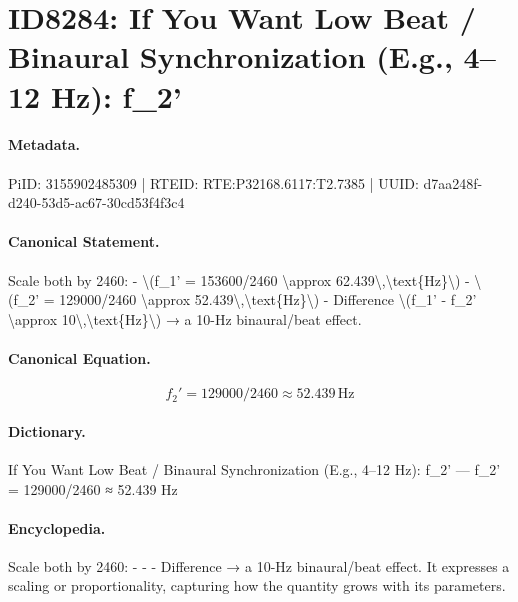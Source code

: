 \section*{ID8284: If You Want Low Beat / Binaural Synchronization (E.g., 4–12 Hz): f\_2'}
\paragraph{Metadata.}
PiID: 3155902485309 | RTEID: RTE:P32168.6117:T2.7385 | UUID: d7aa248f-d240-53d5-ac67-30cd53f4f3c4

\paragraph{Canonical Statement.}
Scale both by 2460: - \textbackslash{}(f\_1' = 153600/2460 \textbackslash{}approx 62.439\textbackslash{},\textbackslash{}text\{Hz\}\textbackslash{}) - \textbackslash{}(f\_2' = 129000/2460 \textbackslash{}approx 52.439\textbackslash{},\textbackslash{}text\{Hz\}\textbackslash{}) - Difference \textbackslash{}(f\_1' - f\_2' \textbackslash{}approx 10\textbackslash{},\textbackslash{}text\{Hz\}\textbackslash{}) → a 10-Hz binaural/beat effect.

\paragraph{Canonical Equation.}
\[
f_2' = 129000/2460 \approx 52.439\,\text{Hz}
\]

\paragraph{Dictionary.}
If You Want Low Beat / Binaural Synchronization (E.g., 4–12 Hz): f\_2' — f\_2' = 129000/2460 ≈ 52.439 Hz

\paragraph{Encyclopedia.}
Scale both by 2460: - - - Difference → a 10-Hz binaural/beat effect. It expresses a scaling or proportionality, capturing how the quantity grows with its parameters.
